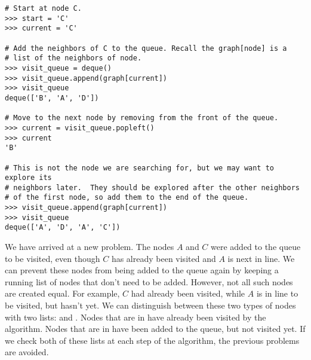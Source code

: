 \begin{lstlisting}
# Start at node C.
>>> start = 'C'
>>> current = 'C'

# Add the neighbors of C to the queue. Recall the graph[node] is a
# list of the neighbors of node.
>>> visit_queue = deque()
>>> visit_queue.append(graph[current])
>>> visit_queue
deque(['B', 'A', 'D'])

# Move to the next node by removing from the front of the queue.
>>> current = visit_queue.popleft()
>>> current
'B'

# This is not the node we are searching for, but we may want to explore its 
# neighbors later.  They should be explored after the other neighbors
# of the first node, so add them to the end of the queue.
>>> visit_queue.append(graph[current])
>>> visit_queue
deque(['A', 'D', 'A', 'C'])
\end{lstlisting}

We have arrived at a new problem.
The nodes $A$ and $C$ were added to the queue to be visited, even though $C$ has already been visited and $A$ is next in line.
We can prevent these nodes from being added to the queue again by keeping a running list of nodes that don't need to be added.
However, not all such nodes are created equal.
For example, $C$ had already been visited, while $A$ is in line to be visited, but hasn't yet.
We can distinguish between these two types of nodes with two lists:  and .
Nodes that are in  have already been visited by the algorithm.
Nodes that are in  have been added to the queue, but not visited yet.
If we check both of these lists at each step of the algorithm, the previous problems are avoided.

